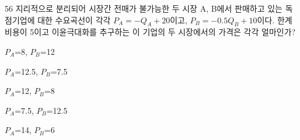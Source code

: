 \begin{question}{56}
지리적으로 분리되어 시장간 전매가 불가능한 두 시장 A, B에서 판매하고 있는 독점기업에 대한 수요곡선이 각각 $P_{ A } =-Q_{ A } + 20$이고, $P_{ B } =-0.5Q_{ B } +10$이다. 한계비용이 5이고 이윤극대화를 추구하는 이 기업의 두 시장에서의 가격은 각각 얼마인가?
\begin{choices}
  \item $P_{ A }$=8, $P_{ B }$=12
  \item $P_{ A }$=12.5, $P_{ B }$=7.5
  \item $P_{ A }$=12, $P_{ B }$=8
  \item $P_{ A }$=7.5, $P_{ B }$=12.5
  \item $P_{ A }$=14, $P_{ B }$=6
\end{choices}
\end{question}
